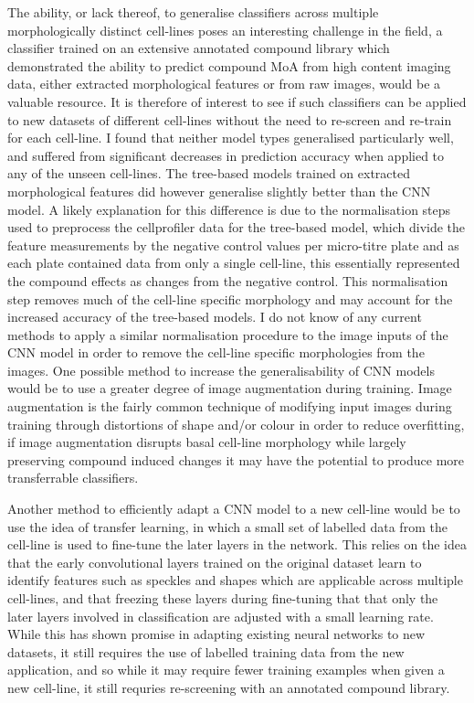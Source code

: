 \documentclass[a4paper,11pt,twoside,openright]{scrbook}
\begin{document}
The ability, or lack thereof, to generalise classifiers across multiple morphologically distinct cell-lines poses an interesting challenge in the field, a classifier trained on an extensive annotated compound library which demonstrated the ability to predict compound MoA from high content imaging data, either extracted morphological features or from raw images, would be a valuable resource.
It is therefore of interest to see if such classifiers can be applied to new datasets of different cell-lines without the need to re-screen and re-train for each cell-line.
I found that neither model types generalised particularly well, and suffered from significant decreases in prediction accuracy when applied to any of the unseen cell-lines.
The tree-based models trained on extracted morphological features did however generalise slightly better than the CNN model.
A likely explanation for this difference is due to the normalisation steps used to preprocess the cellprofiler data for the tree-based model, which divide the feature measurements by the negative control values per micro-titre plate and as each plate contained data from only a single cell-line, this essentially represented the compound effects as changes from the negative control.
This normalisation step removes much of the cell-line specific morphology and may account for the increased accuracy of the tree-based models.
I do not know of any current methods to apply a similar normalisation procedure to the image inputs of the CNN model in order to remove the cell-line specific morphologies from the images.
One possible method to increase the generalisability of CNN models would be to use a greater degree of image augmentation during training.
Image augmentation is the fairly common technique of modifying input images during training through distortions of shape and/or colour in order to reduce overfitting, \cite{Perez2017,Bloice2017} if image augmentation disrupts basal cell-line morphology while largely preserving compound induced changes it may have the potential to produce more transferrable classifiers.

Another method to efficiently adapt a CNN model to a new cell-line would be to use the idea of transfer learning, in which a small set of labelled data from the cell-line is used to fine-tune the later layers in the network.
This relies on the idea that the early convolutional layers trained on the original dataset learn to identify features such as speckles and shapes which are applicable across multiple cell-lines, and that freezing these layers during fine-tuning that that only the later layers involved in classification are adjusted with a small learning rate. \cite{Pawlowski2016,Kensert2018}
While this has shown promise in adapting existing neural networks to new datasets, it still requires the use of labelled training data from the new application, and so while it may require fewer training examples when given a new cell-line, it still requries re-screening with an annotated compound library.
\end{document}
